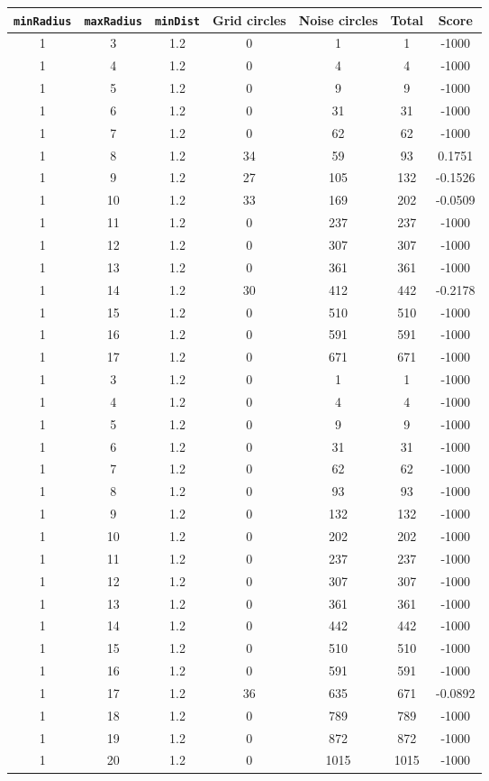 \documentclass[letterpaper, 12pt]{article}
\begin{document}
\begin{longtable}{|c|c|c|c|c|c|c|}
\hline
\textbf{\texttt{minRadius}} & \textbf{\texttt{maxRadius}} & \textbf{\texttt{minDist}} & \textbf{Grid circles} & \textbf{Noise circles} & \textbf{Total} & \textbf{Score} \\
\hline
1 & 3 & 1.2 & 0 & 1 & 1 & -1000 \\
\hline
1 & 4 & 1.2 & 0 & 4 & 4 & -1000 \\
\hline
1 & 5 & 1.2 & 0 & 9 & 9 & -1000 \\
\hline
1 & 6 & 1.2 & 0 & 31 & 31 & -1000 \\
\hline
1 & 7 & 1.2 & 0 & 62 & 62 & -1000 \\
\hline
1 & 8 & 1.2 & 34 & 59 & 93 & 0.1751 \\
\hline
1 & 9 & 1.2 & 27 & 105 & 132 & -0.1526 \\
\hline
1 & 10 & 1.2 & 33 & 169 & 202 & -0.0509 \\
\hline
1 & 11 & 1.2 & 0 & 237 & 237 & -1000 \\
\hline
1 & 12 & 1.2 & 0 & 307 & 307 & -1000 \\
\hline
1 & 13 & 1.2 & 0 & 361 & 361 & -1000 \\
\hline
1 & 14 & 1.2 & 30 & 412 & 442 & -0.2178 \\
\hline
1 & 15 & 1.2 & 0 & 510 & 510 & -1000 \\
\hline
1 & 16 & 1.2 & 0 & 591 & 591 & -1000 \\
\hline
1 & 17 & 1.2 & 0 & 671 & 671 & -1000 \\
\hline
1 & 3 & 1.2 & 0 & 1 & 1 & -1000 \\
\hline
1 & 4 & 1.2 & 0 & 4 & 4 & -1000 \\
\hline
1 & 5 & 1.2 & 0 & 9 & 9 & -1000 \\
\hline
1 & 6 & 1.2 & 0 & 31 & 31 & -1000 \\
\hline
1 & 7 & 1.2 & 0 & 62 & 62 & -1000 \\
\hline
1 & 8 & 1.2 & 0 & 93 & 93 & -1000 \\
\hline
1 & 9 & 1.2 & 0 & 132 & 132 & -1000 \\
\hline
1 & 10 & 1.2 & 0 & 202 & 202 & -1000 \\
\hline
1 & 11 & 1.2 & 0 & 237 & 237 & -1000 \\
\hline
1 & 12 & 1.2 & 0 & 307 & 307 & -1000 \\
\hline
1 & 13 & 1.2 & 0 & 361 & 361 & -1000 \\
\hline
1 & 14 & 1.2 & 0 & 442 & 442 & -1000 \\
\hline
1 & 15 & 1.2 & 0 & 510 & 510 & -1000 \\
\hline
1 & 16 & 1.2 & 0 & 591 & 591 & -1000 \\
\hline
1 & 17 & 1.2 & 36 & 635 & 671 & -0.0892 \\
\hline
1 & 18 & 1.2 & 0 & 789 & 789 & -1000 \\
\hline
1 & 19 & 1.2 & 0 & 872 & 872 & -1000 \\
\hline
1 & 20 & 1.2 & 0 & 1015 & 1015 & -1000 \\
\hline
\end{longtable}
\end{document}
